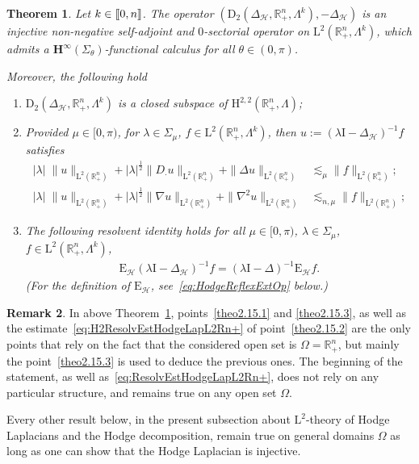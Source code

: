 \documentclass[10pt]{amsart}
\newtheorem{theo}{Theorem}[section]
\theoremstyle{definition}\newtheorem{defi}[theo]{Definition}\newtheorem{rema}[theo]{Remark}\newtheorem{exam}[theo]{Example}\newtheorem{exem}[theo]{Example}\newtheorem{nota}[theo]{Notation}
\newcommand{\bbR}{\mathbb{R}}
\newcommand{\rmH}{\mathrm{H}}%
\newcommand{\rmD}{\mathrm{D}}
\newcommand{\rmL}{\mathrm{L}}
\newcommand{\rmE}{\mathrm{E}}
\newcommand{\rmI}{\mathrm{I}}
\newcommand{\clH}{\mathcal{H}}
\newcommand{\bfH}{\mathbf{H}}
\newcommand{\llbracket}{\mathopen{[\mkern -2.7mu[}}
\newcommand{\rrbracket}{\mathclose{]\mkern -2.7mu]}}
\newcommand{\llb}{\llbracket}
\newcommand{\rrb}{\rrbracket}
\newcommand*{\romanenumi}{\renewcommand*{\theenumi}{\roman{enumi}}}
\begin{document}
\begin{theo}\label{thm:HodgeLapL2Rn+}
Let $k\in\llb 0,n\rrb$. The operator $(\rmD_2(\Delta_\clH,\bbR^n_+,\Lambda^k),-\Delta_\clH)$ is an injective non-negative self-adjoint and $0$-sectorial operator on $\rmL^2(\bbR^n_+,\Lambda^k)$, which admits a $\bfH^\infty(\Sigma_\theta)$-functional calculus for all $\theta\in(0,\pi)$.


Moreover, the following hold
\begin{enumerate}\romanenumi
\item\label{theo2.15.1} $\rmD_2(\Delta_\clH,\bbR^n_+,\Lambda^k)$ is a closed subspace of $\rmH^{2,2}(\bbR^n_+,\Lambda)$;
\item\label{theo2.15.2} Provided $\mu\in [0,\pi)$, for $\lambda\in\Sigma_\mu$, $f\in\rmL^2(\bbR^n_+,\Lambda^k)$, then $u:=(\lambda\rmI -\Delta_\clH)^{-1}f $ satisfies
\begin{align}
|\lambda|\;\| u\|_{{\rmL}^{2}\left(\bbR^n_+\right)}+|\lambda|^\frac{1}{2}\| D_{\cdot} u\|_{{\rmL}^{2}\left(\bbR^n_+\right)}+\| \Delta u\|_{{\rmL}^{2}\left(\bbR^n_+\right)} &\lesssim_{\mu} \| f\|_{{\rmL}^{2}\left(\bbR^n_+\right)} ;\label{eq:ResolvEstHodgeLapL2Rn+}
\\
|\lambda|\;\| u\|_{{\rmL}^{2}\left(\bbR^n_+\right)}+|\lambda|^\frac{1}{2}\| \nabla u\|_{{\rmL}^{2}\left(\bbR^n_+\right)}+\| \nabla^2 u\|_{{\rmL}^{2}\left(\bbR^n_+\right)} &\lesssim_{n,\mu} \| f\|_{{\rmL}^{2}\left(\bbR^n_+\right)} \label{eq:H2ResolvEstHodgeLapL2Rn+}
;
\end{align}
\item\label{theo2.15.3} The following resolvent identity holds for all $\mu\in [0,\pi)$, $\lambda\in\Sigma_\mu$, $f\in\rmL^2(\bbR^n_+,\Lambda^k)$,
\begin{align*}
\rmE_\clH(\lambda\rmI -\Delta_\clH)^{-1}f = (\lambda\rmI -\Delta)^{-1}\rmE_\clH f.
\end{align*}
(For the definition of $\rmE_\clH$, see~\eqref{eq:HodgeReflexExtOp} below.)
\end{enumerate}
\end{theo}


\begin{rema}
In above Theorem~\ref{thm:HodgeLapL2Rn+}, points~\eqref{theo2.15.1} and \eqref{theo2.15.3}, as well as the estimate~\eqref{eq:H2ResolvEstHodgeLapL2Rn+} of point~\eqref{theo2.15.2} are the only points that rely on the fact that the considered open set is $\Omega=\bbR^n_+$, but mainly the point~\eqref{theo2.15.3} is used to deduce the previous ones.
The beginning of the statement, as well as~\eqref{eq:ResolvEstHodgeLapL2Rn+}, does not rely on any particular structure, and remains true on any open set $\Omega$.

Every other result below, in the present subsection about $\rmL^2$-theory of Hodge Laplacians and the Hodge decomposition, remain true on general domains $\Omega$ as long as one can show that the Hodge Laplacian is injective.
\end{rema}
\end{document}
